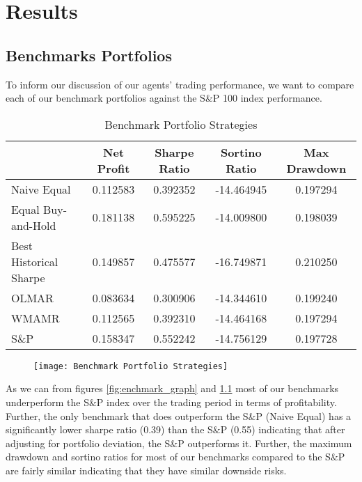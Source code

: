 \chapter{Results}

\section{Benchmarks Portfolios}
To inform our discussion of our agents' trading performance, we want to compare each of our benchmark portfolios against the S$\&$P 100 index performance.


\begin{table}[htbp]
    \centering
    \caption{Benchmark Portfolio Strategies}
      \begin{tabular}{lcccc}
      \toprule
            & Net Profit & Sharpe Ratio & Sortino Ratio & Max Drawdown \\
      \midrule
      Naive Equal & 0.112583 & 0.392352 & -14.464945 & 0.197294 \\
      Equal Buy-and-Hold & 0.181138 & 0.595225 & -14.009800 & 0.198039 \\
      Best Historical Sharpe & 0.149857 & 0.475577 & -16.749871 & 0.210250 \\
      OLMAR & 0.083634 & 0.300906 & -14.344610 & 0.199240 \\
      WMAMR & 0.112565 & 0.392310 & -14.464168 & 0.197294 \\
      S\&P & 0.158347 & 0.552242 & -14.756129 & 0.197728 \\
      \bottomrule
      \end{tabular}%
    \label{tab:benchmark_table}%
  \end{table}%

  \begin{center}
    \begin{figure}[h!]
    \texttt{[image: Benchmark Portfolio Strategies]}
    \end{figure}
    \label{fig:benchmark_graph}
    \end{center}

As we can from figures \ref{fig:enchmark_graph} and \ref{tab:benchmark_table} most of our benchmarks underperform the S$\&$P index over the trading period in terms of profitability. 
Further, the only benchmark that does outperform the S$\&$P (Naive Equal) has a significantly lower sharpe ratio (0.39) than the S$\&$P (0.55) indicating that after adjusting for portfolio deviation, the S$\&$P outperforms it.
Further, the maximum drawdown and sortino ratios for most of our benchmarks compared to the S$\&$P are fairly similar indicating that they have similar downside risks.

